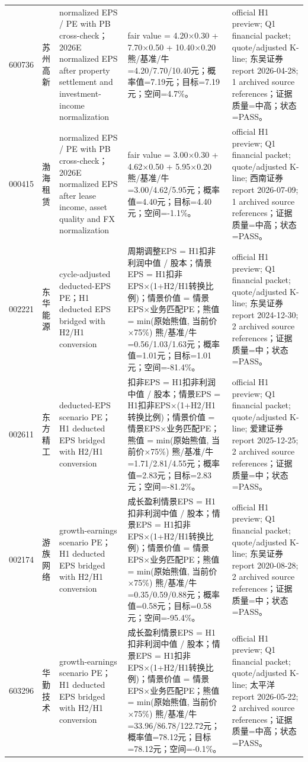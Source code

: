 \begin{longtable}{L{0.85cm}L{1.55cm}L{2.25cm}L{6.0cm}L{4.0cm}}
600736 & 苏州高新 & normalized EPS / PE with PB cross-check；2026E normalized EPS after property settlement and investment-income normalization & fair value = 4.20×0.30 + 7.70×0.50 + 10.40×0.20 熊/基准/牛=4.20/7.70/10.40元；概率值=7.19元；目标=7.19元；空间=4.7\%。 & official H1 preview; Q1 financial packet; quote/adjusted K-line; 东吴证券 report 2026-04-28; 1 archived source references；证据质量=中高；状态=PASS。 \\
000415 & 渤海租赁 & normalized EPS / PE with PB cross-check；2026E normalized EPS after lease income, asset quality and FX normalization & fair value = 3.00×0.30 + 4.62×0.50 + 5.95×0.20 熊/基准/牛=3.00/4.62/5.95元；概率值=4.40元；目标=4.40元；空间=-1.1\%。 & official H1 preview; Q1 financial packet; quote/adjusted K-line; 西南证券 report 2026-07-09; 1 archived source references；证据质量=中高；状态=PASS。 \\
002221 & 东华能源 & cycle-adjusted deducted-EPS PE；H1 deducted EPS bridged with H2/H1 conversion & 周期调整EPS = H1扣非利润中值 / 股本；情景EPS = H1扣非EPS×(1+H2/H1转换比例)；情景价值 = 情景EPS×业务匹配PE；熊值 = min(原始熊值, 当前价×75\%) 熊/基准/牛=0.56/1.03/1.63元；概率值=1.01元；目标=1.01元；空间=-81.4\%。 & official H1 preview; Q1 financial packet; quote/adjusted K-line; 东吴证券 report 2024-12-30; 2 archived source references；证据质量=中；状态=PASS。 \\
002611 & 东方精工 & deducted-EPS scenario PE；H1 deducted EPS bridged with H2/H1 conversion & 扣非EPS = H1扣非利润中值 / 股本；情景EPS = H1扣非EPS×(1+H2/H1转换比例)；情景价值 = 情景EPS×业务匹配PE；熊值 = min(原始熊值, 当前价×75\%) 熊/基准/牛=1.71/2.81/4.55元；概率值=2.83元；目标=2.83元；空间=-81.2\%。 & official H1 preview; Q1 financial packet; quote/adjusted K-line; 爱建证券 report 2025-12-25; 2 archived source references；证据质量=中；状态=PASS。 \\
002174 & 游族网络 & growth-earnings scenario PE；H1 deducted EPS bridged with H2/H1 conversion & 成长盈利情景EPS = H1扣非利润中值 / 股本；情景EPS = H1扣非EPS×(1+H2/H1转换比例)；情景价值 = 情景EPS×业务匹配PE；熊值 = min(原始熊值, 当前价×75\%) 熊/基准/牛=0.35/0.59/0.88元；概率值=0.58元；目标=0.58元；空间=-95.4\%。 & official H1 preview; Q1 financial packet; quote/adjusted K-line; 东吴证券 report 2020-08-28; 2 archived source references；证据质量=中；状态=PASS。 \\
603296 & 华勤技术 & growth-earnings scenario PE；H1 deducted EPS bridged with H2/H1 conversion & 成长盈利情景EPS = H1扣非利润中值 / 股本；情景EPS = H1扣非EPS×(1+H2/H1转换比例)；情景价值 = 情景EPS×业务匹配PE；熊值 = min(原始熊值, 当前价×75\%) 熊/基准/牛=33.96/86.78/122.72元；概率值=78.12元；目标=78.12元；空间=-0.1\%。 & official H1 preview; Q1 financial packet; quote/adjusted K-line; 太平洋 report 2026-05-22; 2 archived source references；证据质量=中高；状态=PASS。 \\
\bottomrule
\end{longtable}
\normalsize

